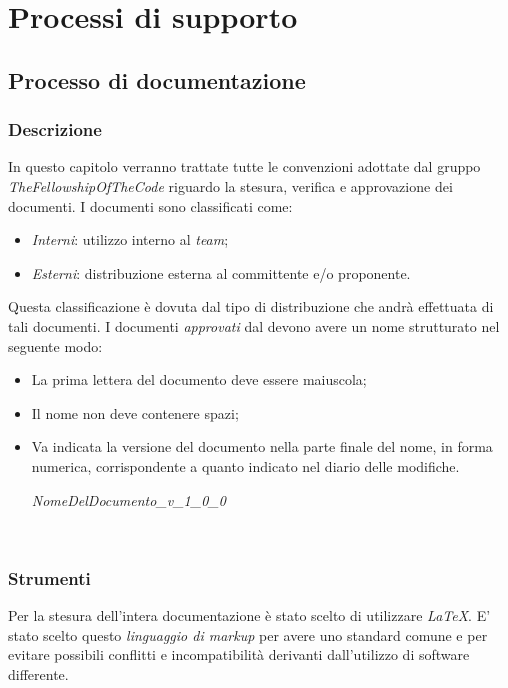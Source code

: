 \section{Processi di supporto}
\subsection{Processo di documentazione}
\subsubsection{Descrizione}
In questo capitolo verranno trattate tutte le convenzioni adottate dal gruppo
\textit{TheFellowshipOfTheCode} riguardo la stesura, verifica e approvazione dei
documenti.
I documenti sono classificati come:
\begin{itemize}
  \item \textit{Interni}: utilizzo interno al \textit{team};
  \item \textit{Esterni}: distribuzione esterna al committente e/o proponente.
\end{itemize}
Questa classificazione è dovuta dal tipo di distribuzione che andrà effettuata di tali documenti.
I documenti \textit{approvati} dal \textit{\RdP} devono avere un nome strutturato nel seguente modo:
\begin{itemize}
  \item La prima lettera del documento deve essere maiuscola;
  \item Il nome non deve contenere spazi;
  \item Va indicata la versione del documento nella parte finale del nome, in forma numerica,
  corrispondente a quanto indicato nel diario delle modifiche.
  \begin{center}
  \textit{NomeDelDocumento\_v\_1\_0\_0}
  \end{center}\
\end{itemize}
\subsubsection{Strumenti}
Per la stesura dell'intera documentazione è stato scelto di utilizzare \textit{\LaTeX{}}.
E' stato scelto questo \textit{linguaggio di markup\ped{G}} per avere uno
standard comune e per evitare possibili conflitti e incompatibilità derivanti
dall'utilizzo di software differente.
